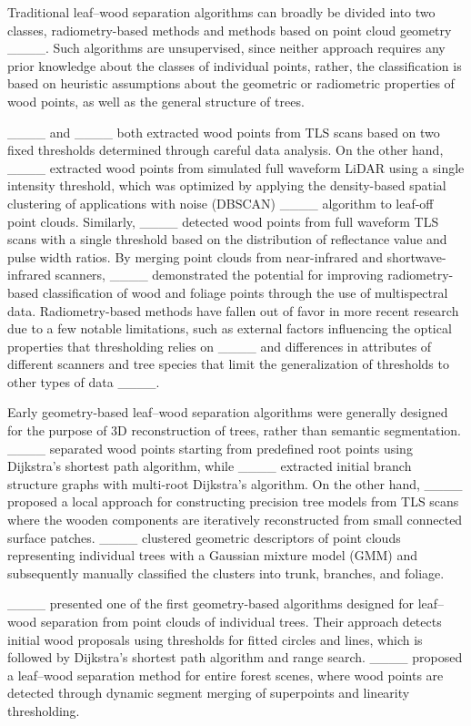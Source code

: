 Traditional leaf--wood separation algorithms can broadly be divided into two classes, radiometry-based methods and methods based on point cloud geometry ____. Such algorithms are unsupervised, since neither approach requires any prior knowledge about the classes of individual points, rather, the classification is based on heuristic assumptions about the geometric or radiometric properties of wood points, as well as the general structure of trees.

____ and ____ both extracted wood points from TLS scans based on two fixed thresholds determined through careful data analysis. On the other hand, ____ extracted wood points from simulated full waveform LiDAR using a single intensity threshold, which was optimized by applying the density-based spatial clustering of applications with noise (DBSCAN) ____ algorithm to leaf-off point clouds. Similarly, ____ detected wood points from full waveform TLS scans with a single threshold based on the distribution of reflectance value and pulse width ratios. By merging point clouds from near-infrared and shortwave-infrared scanners, ____ demonstrated the potential for improving radiometry-based classification of wood and foliage points through the use of multispectral data. Radiometry-based methods have fallen out of favor in more recent research due to a few notable limitations, such as external factors influencing the optical properties that thresholding relies on ____ and differences in attributes of different scanners and tree species that limit the generalization of thresholds to other types of data ____.

Early geometry-based leaf--wood separation algorithms were generally designed for the purpose of 3D reconstruction of trees, rather than semantic segmentation. ____ separated wood points starting from predefined root points using Dijkstra's shortest path algorithm, while ____ extracted initial branch structure graphs with multi-root Dijkstra’s algorithm. On the other hand, ____ proposed a local approach for constructing precision tree models from TLS scans where the wooden components are iteratively reconstructed from small connected surface patches. ____ clustered geometric descriptors of point clouds representing individual trees with a Gaussian mixture model (GMM) and subsequently manually classified the clusters into trunk, branches, and foliage.

____ presented one of the first geometry-based algorithms designed for leaf--wood separation from point clouds of individual trees. Their approach detects initial wood proposals using thresholds for fitted circles and lines, which is followed by Dijkstra's shortest path algorithm and range search. ____ proposed a leaf--wood separation method for entire forest scenes, where wood points are detected through dynamic segment merging of superpoints and linearity thresholding.

